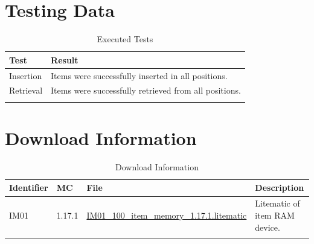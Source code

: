 \documentclass[10pt]{datasheet}
\begin{document}
\section{Testing Data}

\begin{table}[h]
\caption{Executed Tests}
\begin{tabularx}{\textwidth}{l | X}
    \thickhline
    \textbf{Test} & \textbf{Result} \\
    \hline
    Insertion & Items were successfully inserted in all positions. \\
    \hline
    Retrieval & Items were successfully retrieved from all positions. \\
    \thickhline
\end{tabularx}
\end{table}

\section{Download Information}
\begin{table}[h]
    \caption{Download Information}
    \begin{tabularx}{\textwidth}{l | l | l | X}
        \thickhline
        \textbf{Identifier} & \textbf{MC} & \textbf{File} & \textbf{Description} \\
        \hline
        IM01 & 1.17.1 & \href{https://github.com/Soontech-Annals/Archive/blob/8413f90a054b6c415703bae02badeba7541344f6/Archive/item-memory/IM01\%20100\%20Item\%20RAM/IM01\_100\_item\_memory\_1.17.1.litematic?raw=1}{IM01\_100\_item\_memory\_1.17.1.litematic} & Litematic of item RAM device. \\
        \thickhline
    \end{tabularx}
\end{table}
\end{document}
